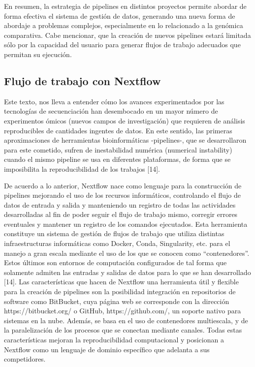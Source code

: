 \documentclass[12pt]{article}
\begin{document}
En resumen, la estrategia de pipelines en distintos proyectos permite abordar de 
forma efectiva el sistema de gestión de datos, generando una nueva forma de abordaje 
a problemas complejos, especialmente en lo relacionado a la genómica comparativa. 
Cabe mencionar, que la creación de nuevos pipelines estará limitada sólo por la 
capacidad del usuario para generar flujos de trabajo adecuados que permitan su 
ejecución.

\subsection*{Flujo de trabajo con Nextflow}

Este texto, nos lleva a entender cómo los avances experimentados por las 
tecnologías de secuenciación han desembocado en un mayor número de experimentos 
ómicos (nuevos campos de investigación) que requieren de análisis reproducibles 
de cantidades ingentes de datos. En este sentido, las primeras aproximaciones 
de herramientas bioinformáticas -pipelines-, que se desarrollaron para este 
cometido, sufren de inestabilidad numérica (numerical instability) cuando 
el mismo pipeline se usa en diferentes plataformas, de forma que se imposibilita 
la reproducibilidad de los trabajos [14]. 

De acuerdo a lo anterior, Nextflow nace como lenguaje para la construcción de 
pipelines mejorando el uso de los recursos informáticos, controlando el 
flujo de datos de entrada y salida y manteniendo un registro de todas las 
actividades desarrolladas al fin de poder seguir el flujo de trabajo mismo, 
corregir errores eventuales y mantener un registro de los comandos ejecutados. 
Esta herramienta constituye un sistema de gestión de flujos de trabajo que utiliza 
distintas infraestructuras informáticas como Docker, Conda, Singularity, etc. 
para el manejo a gran escala mediante el uso de los que se conocen como “contenedores”. 
Estos últimos son entornos de computación configurados de tal forma que 
solamente admiten las entradas y salidas de datos para lo que se han 
desarrollado [14]. Las características que hacen de Nextflow una 
herramienta útil y flexible para la creación de pipelines son la posibilidad 
integración en repositorios de software como BitBucket, cuya página web se 
corresponde con la dirección https://bitbucket.org/ o GitHub, https://github.com/, 
un soporte nativo para sistemas en la nube. Además, se basa en el uso de 
contenedores multiescala, y de la paralelización de los procesos que se 
conectan mediante canales. Todas estas características mejoran la 
reproducibilidad computacional y posicionan a Nextflow como un lenguaje de 
dominio específico que adelanta a sus competidores. 
\end{document}
